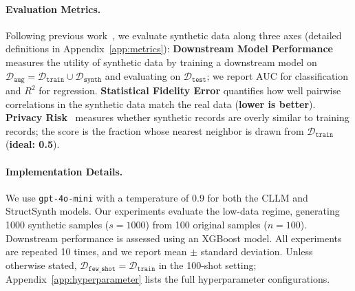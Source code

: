 \paragraph{Evaluation Metrics.}
Following previous work~\cite{borisov2023language, cllm2024}, we evaluate synthetic data along three axes (detailed definitions in Appendix~\ref{app:metrics}): \textbf{Downstream Model Performance} measures the utility of synthetic data by training a downstream model on $\mathcal{D}_{\mathtt{aug}} = \mathcal{D}_{\mathtt{train}} \cup \mathcal{D}_{\mathtt{synth}}$ and evaluating on $\mathcal{D}_{\mathtt{test}}$; we report AUC for classification and $R^2$ for regression. \textbf{Statistical Fidelity Error} quantifies how well pairwise correlations in the synthetic data match the real data (\textbf{lower is better}). \textbf{Privacy Risk}~\cite{van2023membership} measures whether synthetic records are overly similar to training records; the score is the fraction whose nearest neighbor is drawn from $\mathcal{D}_{\mathtt{train}}$ (\textbf{ideal: 0.5}).

\paragraph{Implementation Details.}

We use \texttt{gpt-4o-mini} with a temperature of 0.9 for both the CLLM and \textsf{StructSynth} models. Our experiments evaluate the low-data regime, generating 1000 synthetic samples ($s=1000$) from 100 original samples ($n=100$). Downstream performance is assessed using an XGBoost model. All experiments are repeated 10 times, and we report mean $\pm$ standard deviation. Unless otherwise stated, $\mathcal{D}_{\mathtt{few\_shot}} = \mathcal{D}_{\mathtt{train}}$ in the 100-shot setting; Appendix~\ref{app:hyperparameter} lists the full hyperparameter configurations.


